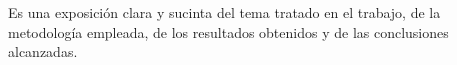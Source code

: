 \documentclass[pregrado]{tesis-usb}
\begin{document}
\frontmatter
\maketitle

\begin{resumen}
Es una exposición clara y sucinta del tema tratado en el trabajo, de la metodología empleada, de los resultados obtenidos y de las conclusiones alcanzadas.
\end{resumen}

\tableofcontents
\end{document}
